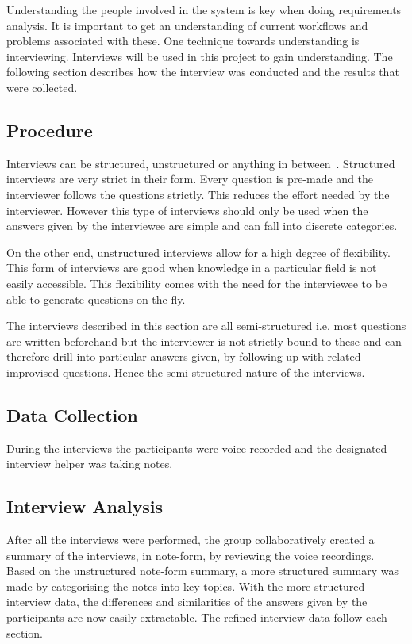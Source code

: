 \label{interviews}

Understanding the people involved in the system is key when doing requirements analysis. It is important to get an understanding of current workflows and problems associated with these. One technique towards understanding is interviewing. Interviews will be used in this project to gain understanding. The following section describes how the interview was conducted and the results that were collected.

\subsection{Procedure}
\label{sub:procedure}
Interviews can be structured, unstructured or anything in between~\cite{benyon2013designing}. Structured interviews are very strict in their form. Every question is pre-made and the interviewer follows the questions strictly. This reduces the effort needed by the interviewer. However this type of interviews should only be used when the answers given by the interviewee are simple and can fall into discrete categories.

On the other end, unstructured interviews allow for a high degree of flexibility. This form of interviews are good when knowledge in a particular field is not easily accessible. This flexibility comes with the need for the interviewee to be able to generate questions on the fly.

The interviews described in this section are all semi-structured i.e. most questions are written beforehand but the interviewer is not strictly bound to these and can therefore drill into particular answers given, by following up with related improvised questions. Hence the semi-structured nature of the interviews.

\subsection{Data Collection}
\label{sub:data_collection}
During the interviews the participants were voice recorded and the designated interview helper was taking notes.

\subsection{Interview Analysis}
\label{sub:interview_analysis}
After all the interviews were performed, the group collaboratively created a summary of the interviews, in note-form, by reviewing the voice recordings. Based on the unstructured note-form summary, a more structured summary was made by categorising the notes into key topics. With the more structured interview data, the differences and similarities of the answers given by the participants are now easily extractable. The refined interview data follow each section.

